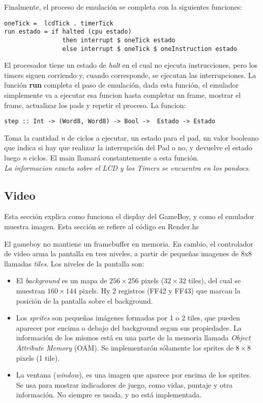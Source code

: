 \documentclass[a4paper,10pt]{report}
\begin{document}
Finalmente, el proceso de emulación se completa con la siguientes funciones:

\begin{verbatim}
oneTick =  lcdTick . timerTick
run estado = if halted (cpu estado)
                then interrupt $ oneTick estado
                else interrupt $ oneTick $ oneInstruction estado
\end{verbatim} 

El procesador tiene un estado de \textit{halt} en el cual no ejecuta instrucciones, pero los timers siguen corriendo y, cuando corresponde, se ejecutan las interrupciones. La función \textbf{run} completa el paso de emulación, dada esta función, el emulador simplemente va a ejecutar esa funcion hasta completar un frame, mostrar el frame, actualizar los pads y repetir el proceso. La funcion:
\begin{verbatim}
step :: Int -> (Word8, Word8) -> Bool ->  Estado -> Estado
\end{verbatim}
Toma la cantidad \textit{n} de ciclos a ejecutar, un estado para el pad, un valor booleano que indica si hay que realizar la interrupción del Pad o no, y devuelve el estado luego \textit{n} ciclos. El main llamará constantemente a esta función.\\

\textit{La informacion exacta sobre el LCD y los Timers se encuentra en los pandocs.}
\subsection*{Video}
Esta sección explica como funciona el display del GameBoy, y como el emulador muestra imagen. Esta sección se refiere al código en Render.hs

El gameboy no mantiene un framebuffer en memoria. En cambio, el controlador de video arma la pantalla en tres niveles, a partir de pequeñas imagenes de 8x8 llamadas \textit{tiles}. Los niveles de la pantalla son:
\begin{itemize}
  \item El \textit{background} es un mapa de $256\times256$ pixels ($32\times32$ tiles), del cual se muestran $160\times144$ pixels. Hy 2 registros (FF42 y FF43) que marcan la posición de la  pantalla sobre el background.
  \item Los \textit{sprites} son pequeñas imágenes formadas por 1 o 2 tiles, que pueden aparecer por encima o debajo del background segun sus propiedades. La información de los mismos está en una parte de la memoria llamada \textit{Object Attribute Memory} (OAM). Se implementarón sólamente los sprites de $8\times8$ pixels (1 tile).
  \item La ventana (\textit{window}), es una imagen que aparece por encima de los sprites. Se usa para mostrar indicadores de juego, como vidas, puntaje y otra información. No siempre es usada, y no está implementada.
\end{itemize}
\end{document}
